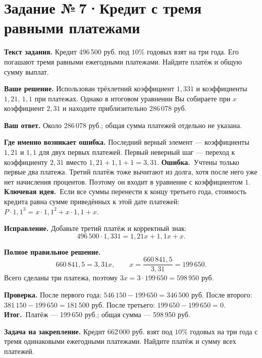 \documentclass[a4paper,11pt]{article}
\newcommand{\err}{\textcolor{red!75!black}{\textbf{Ошибка.}}\ }
\newcommand{\idea}{\textcolor{accent}{\textbf{Ключевая идея.}}\ }
\newcommand{\result}{\textcolor{accent}{\textbf{Итог.}}\ }
\newcommand{\task}[2]{\clearpage\phantomsection\label{task:#1}\section*{Задание №\,#1\;·\;#2}}
\newcommand{\labelp}[1]{\par\smallskip\textbf{#1.}\enspace}
\begin{document}
\task{7}{Кредит с тремя равными платежами}
\labelp{Текст задания} Кредит 496\,500 руб. под $10\%$ годовых взят на три года. Его погашают тремя равными ежегодными платежами. Найдите платёж и общую сумму выплат.
\labelp{Ваше решение} Использован трёхлетний коэффициент $1{,}331$ и коэффициенты $1{,}21$, $1{,}1$ при платежах. Однако в итоговом уравнении Вы собираете при $x$ коэффициент $2{,}31$ и находите приблизительно 286\,078 руб.
\labelp{Ваш ответ} Около 286\,078 руб.; общая сумма платежей отдельно не указана.
\labelp{Где именно возникает ошибка} Последний верный элемент --- коэффициенты $1{,}21$ и $1{,}1$ для двух первых платежей. Первый неверный шаг --- переход к коэффициенту $2{,}31$ вместо $1{,}21+1{,}1+1=3{,}31$.
\err Учтены только первые два платежа. Третий платёж тоже вычитают из долга, хотя после него уже нет начисления процентов. Поэтому он входит в уравнение с коэффициентом $1$.
\idea Если все суммы перенести к концу третьего года, стоимость кредита равна сумме приведённых к этой дате платежей: $P\cdot1{,}1^3=x\cdot1{,}1^2+x\cdot1{,}1+x$.
\labelp{Исправление} Добавьте третий платёж и корректный знак:
\[496\,500\cdot1{,}331=1{,}21x+1{,}1x+x.\]
\labelp{Полное правильное решение}
\[660\,841{,}5=3{,}31x,\qquad x=\frac{660\,841{,}5}{3{,}31}=199\,650.\]
Всего сделаны три платежа, поэтому $3x=3\cdot199\,650=598\,950$ руб.
\labelp{Проверка} После первого года: $546\,150-199\,650=346\,500$ руб. После второго: $381\,150-199\,650=181\,500$ руб. После третьего: $199\,650-199\,650=0$.
\result Платёж --- 199\,650 руб.; общая сумма --- 598\,950 руб.
\labelp{Задача на закрепление} Кредит 662\,000 руб. взят под $10\%$ годовых на три года с тремя одинаковыми ежегодными платежами. Найдите платёж и сумму всех платежей.
\end{document}
